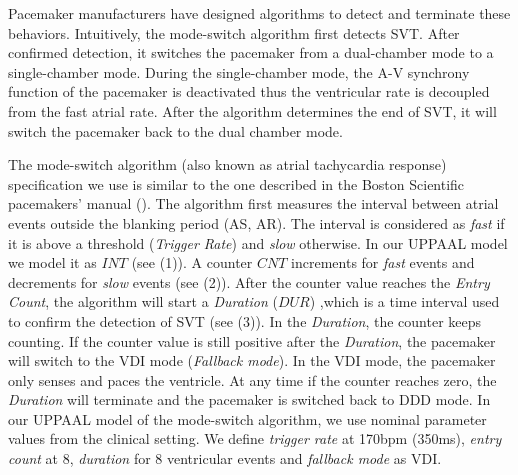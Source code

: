 Pacemaker manufacturers have designed algorithms to detect and terminate these behaviors. Intuitively, the mode-switch algorithm first detects SVT. After confirmed detection, it switches the pacemaker from a dual-chamber mode to a single-chamber mode. During the single-chamber mode, the A-V synchrony function of the pacemaker is deactivated thus the ventricular rate is decoupled from the fast atrial rate. After the algorithm determines the end of SVT, it will switch the pacemaker back to the dual chamber mode. 

The mode-switch algorithm (also known as atrial tachycardia response) specification we use is similar to the one described in the Boston Scientific pacemakers' manual (\cite{compass}). The algorithm first measures the interval between atrial events outside the blanking period (AS, AR). The interval is considered as \emph{fast} if it is above a threshold (\emph{Trigger Rate}) and \emph{slow} otherwise. In our UPPAAL model we model it as $INT$ (see  (1)). A counter $CNT$ increments for \emph{fast} events and decrements for \emph{slow} events (see  (2)). After the counter value reaches the \emph{Entry Count}, the algorithm will start a \emph{Duration} ($DUR$) ,which is a time interval used to confirm the detection of SVT (see  (3)). In the \emph{Duration}, the counter keeps counting. If the counter value is still positive after the \emph{Duration}, the pacemaker will switch to the VDI mode (\emph{Fallback mode}). In the VDI mode, the pacemaker only senses and paces the ventricle. At any time if the counter reaches zero, the \emph{Duration} will terminate and the pacemaker is switched back to DDD mode.
In our UPPAAL model of the mode-switch algorithm, we use nominal parameter values from the clinical setting. We define \emph{trigger rate} at 170bpm (350ms), \emph{entry count} at 8, \emph{duration} for 8 ventricular events and \emph{fallback mode} as VDI. 

